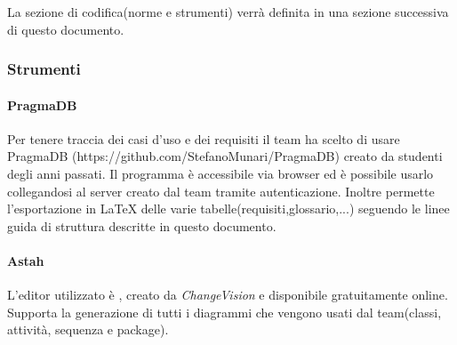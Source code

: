 			La sezione di codifica(norme e strumenti) verrà definita in una sezione successiva di questo documento.
		\subsubsection{Strumenti}
			\paragraph{PragmaDB}
				Per tenere traccia dei casi d'uso e dei requisiti il team ha scelto di usare PragmaDB (https://github.com/StefanoMunari/PragmaDB) creato da studenti degli anni passati. Il programma è accessibile via browser ed è possibile usarlo collegandosi al server creato dal team tramite autenticazione. Inoltre permette l'esportazione in \LaTeX{} delle varie tabelle(requisiti,glossario,...) seguendo le linee guida di struttura descritte in questo documento.
			\paragraph{Astah}
				L'editor  utilizzato è , creato da \textit{ChangeVision} e disponibile gratuitamente online. Supporta la generazione di tutti i diagrammi che vengono usati dal team(classi, attività, sequenza e package).
	

